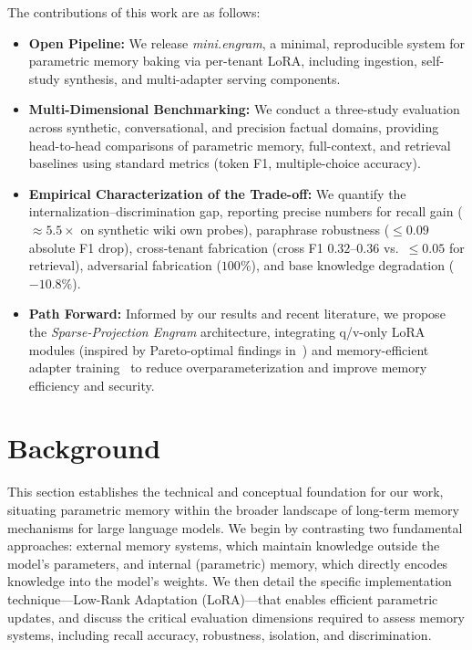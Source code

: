 \documentclass[conference]{IEEEtran}
\begin{document}
The contributions of this work are as follows:
\begin{itemize}
    \item \textbf{Open Pipeline:} We release \textit{mini.engram}, a minimal, reproducible system for parametric memory baking via per-tenant LoRA, including ingestion, self-study synthesis, and multi-adapter serving components.
    \item \textbf{Multi-Dimensional Benchmarking:} We conduct a three-study evaluation across synthetic, conversational, and precision factual domains, providing head-to-head comparisons of parametric memory, full-context, and retrieval baselines using standard metrics (token F1, multiple-choice accuracy).
    \item \textbf{Empirical Characterization of the Trade-off:} We quantify the internalization--discrimination gap, reporting precise numbers for recall gain ($\approx 5.5\times$ on synthetic wiki own probes), paraphrase robustness ($\le 0.09$ absolute F1 drop), cross-tenant fabrication (cross F1 $0.32$--$0.36$ vs.\ $\le 0.05$ for retrieval), adversarial fabrication ($100\%$), and base knowledge degradation ($-10.8\%$).
    \item \textbf{Path Forward:} Informed by our results and recent literature, we propose the \textit{Sparse-Projection Engram} architecture, integrating q/v-only LoRA modules (inspired by Pareto-optimal findings in~\cite{qvpareto2026}) and memory-efficient adapter training~\cite{carelora2026} to reduce overparameterization and improve memory efficiency and security.
\end{itemize}

\section{Background}
This section establishes the technical and conceptual foundation for our work, situating parametric memory within the broader landscape of long-term memory mechanisms for large language models. We begin by contrasting two fundamental approaches: external memory systems, which maintain knowledge outside the model's parameters, and internal (parametric) memory, which directly encodes knowledge into the model's weights. We then detail the specific implementation technique---Low-Rank Adaptation (LoRA)---that enables efficient parametric updates, and discuss the critical evaluation dimensions required to assess memory systems, including recall accuracy, robustness, isolation, and discrimination.
\end{document}
